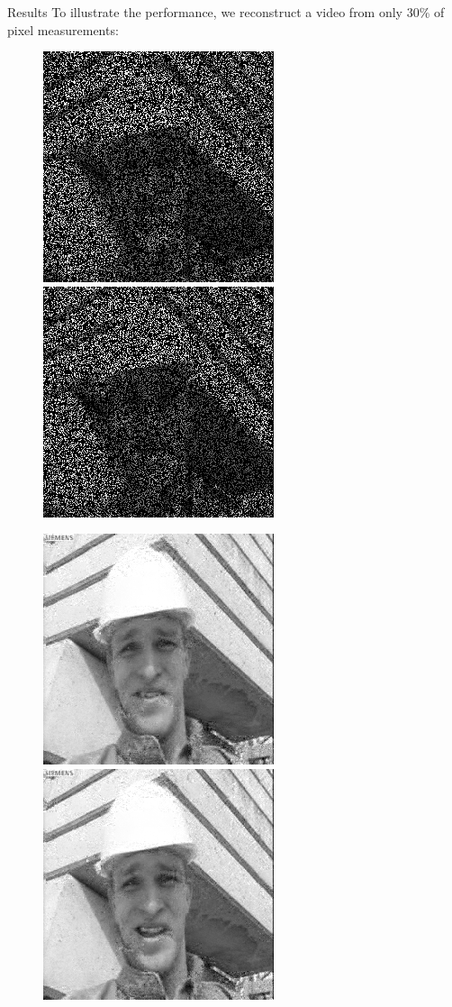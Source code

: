\documentclass[final]{beamer}
\begin{document}
\begin{frame}{}
\begin{textblock}{19.5}
\begin{block}{Results}
To illustrate the performance, we reconstruct a video from only 30\% of pixel measurements:
\begin{figure}
\begin{minipage}{0.8\linewidth}
\centering
\includegraphics[width = 0.4\linewidth]{foreman_large_masked_42.png}
\includegraphics[width = 0.4\linewidth]{foreman_large_masked_43.png}
\end{minipage}
\begin{minipage}{0.8\linewidth}
\centering
\includegraphics[width = 0.4\linewidth]{foreman_large_rec_42.png}
\includegraphics[width = 0.4\linewidth]{foreman_large_rec_43.png}

\end{minipage}
\end{figure}
\end{block}
\end{textblock}
\end{frame}
\end{document}

